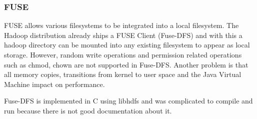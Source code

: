 \subsubsection{FUSE}

FUSE allows various filesystems to be integrated into a local filesystem. The Hadoop distribution already ships a FUSE Client (Fuse-DFS) and with this a hadoop directory can be mounted into any existing filesystem to appear as local storage.
However, random write operations and permission related operations such as chmod, chown are not supported in Fuse-DFS. Another problem is that all memory copies, transitions from kernel to user space and the Java Virtual Machine impact on performance.

Fuse-DFS is implemented in C using libhdfs and was complicated to compile and run because there is not good documentation about it.
